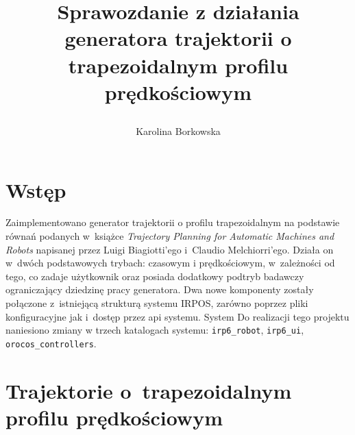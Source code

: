 \documentclass[a4paper, 12pt]{article}
\title{Sprawozdanie z działania generatora trajektorii o trapezoidalnym profilu prędkościowym \author{Karolina Borkowska}}
\begin{document}
	\maketitle

	\vspace{50px}

	\section{Wstęp}
	\label{sec:intro}
	
	Zaimplementowano generator trajektorii o profilu trapezoidalnym na podstawie równań podanych w~książce \textit{Trajectory Planning for Automatic Machines and Robots} napisanej przez Luigi Biagiotti'ego i~Claudio Melchiorri'ego. Działa on w~dwóch podstawowych trybach: czasowym i prędkościowym, w~zależności od tego, co zadaje użytkownik oraz posiada dodatkowy podtryb badawczy ograniczający dziedzinę pracy generatora.
	Dwa nowe komponenty zostały połączone z~istniejącą strukturą systemu IRPOS, zarówno poprzez pliki konfiguracyjne jak i~dostęp przez api systemu. System  Do realizacji tego projektu naniesiono zmiany w trzech katalogach systemu: \texttt{irp6\_robot}, \texttt{irp6\_ui}, \texttt{orocos\_controllers}. 
	
	\section{Trajektorie o~trapezoidalnym profilu prędkościowym}
	\label{sec:math}
	
\end{document}
